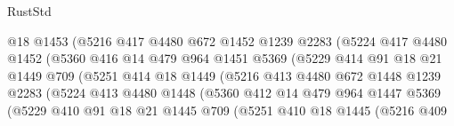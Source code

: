 \begin{lexlean}{RustStd}
\begin{coremodule}
                          @18
                          @1453
                          (@5216
                            @417
                            @4480
                            @672
                            @1452
                            @1239
                            @2283
                            (@5224
                              @417
                              @4480
                              @1452
                              (@5360
                                @416
                                @14
                                @479
                                @964
                                @1451
                                @5369
                                (@5229
                                  @414
                                  @91
                                  @18
                                  @21
                                  @1449
                                  @709
                                  (@5251
                                    @414
                                    @18
                                    @1449
                                    (@5216
                                      @413
                                      @4480
                                      @672
                                      @1448
                                      @1239
                                      @2283
                                      (@5224
                                        @413
                                        @4480
                                        @1448
                                        (@5360
                                          @412
                                          @14
                                          @479
                                          @964
                                          @1447
                                          @5369
                                          (@5229
                                            @410
                                            @91
                                            @18
                                            @21
                                            @1445
                                            @709
                                            (@5251
                                              @410
                                              @18
                                              @1445
                                              (@5216
                                                @409

\end{coremodule}
\end{lexlean}
